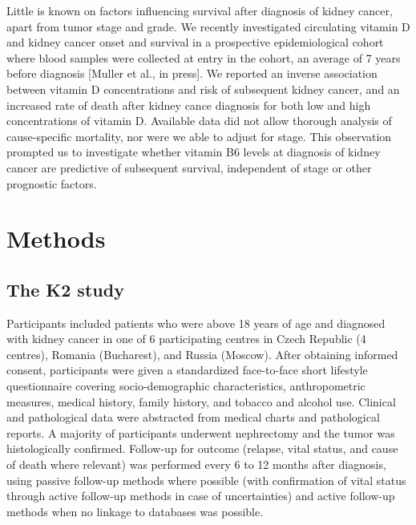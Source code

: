 \documentclass[a4paper,11pt]{article}
\begin{document}
Little is known on factors influencing survival after diagnosis of kidney 
cancer, apart from tumor stage and grade. We recently investigated circulating 
vitamin D and kidney cancer onset and survival in a prospective epidemiological 
cohort where blood samples were collected at entry in the cohort, an average 
of 7 years before diagnosis [Muller et al., in press]. We reported an inverse 
association between vitamin D concentrations and risk of subsequent kidney 
cancer, and an increased rate of death after kidney cance diagnosis for both 
low and high concentrations of vitamin D. Available data did not allow thorough 
analysis of cause-specific mortality, nor were we able to adjust for stage. This 
observation prompted us to investigate whether vitamin B6 levels at diagnosis of 
kidney cancer are predictive of subsequent survival, independent of stage or 
other prognostic factors.   

\section*{Methods}
\subsection*{The K2 study}
Participants included patients who were above 18 years of age and diagnosed 
with kidney cancer in one of 6 participating centres in Czech Republic (4 
centres), Romania (Bucharest), and Russia (Moscow). After obtaining informed 
consent, participants were given a standardized face-to-face short lifestyle 
questionnaire covering socio-demographic characteristics, anthropometric 
measures, medical history, family history, and tobacco and alcohol use. 
Clinical and pathological data were abstracted from medical charts and 
pathological reports. A majority of participants underwent nephrectomy and the 
tumor was histologically confirmed. Follow-up for outcome (relapse, vital 
status, and cause of death where relevant) was performed every 6 to 12 months 
after diagnosis, using passive follow-up methods where possible (with 
confirmation of vital status through active follow-up methods in case of 
uncertainties) and active follow-up methods when no linkage to databases was 
possible.
\end{document}
